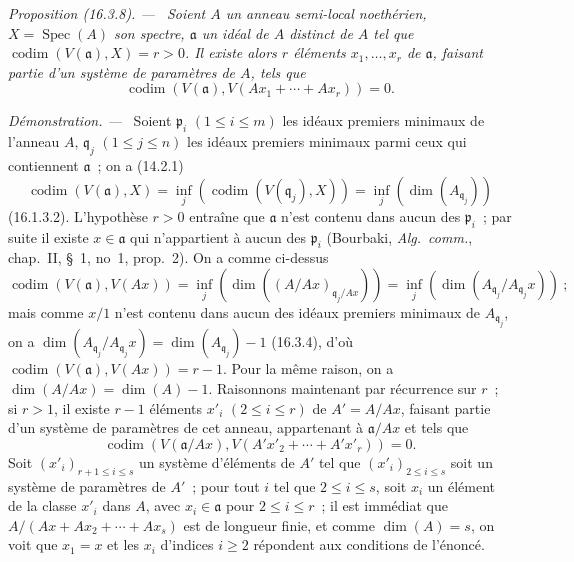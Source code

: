 \documentclass[10pt,oneside]{book}
\makeatletter
\newcommand{\setmanualcurrentlabel}[1]{\def\@currentlabel{#1}}
\newcommand{\oldpage}[2][]{%
  \setcounter{footnote}{0}%
  \marginpar{\scriptsize\textbf{#1}~|~#2}\ignorespaces}
\newenvironment{proposition}[1][]{%
  \setmanualcurrentlabel{#1}\par\medskip\noindent\itshape Proposition (#1). ---\ }{\par}
\newenvironment{proof}{%
  \par\medskip\noindent\textit{Démonstration. ---\ }}{\par}
\makeatother
\begin{document}
\oldpage[0\textsubscript{IV-1}]{31}

\begin{proposition}[16.3.8]
\label{0.16.3.8-fr}
Soient $A$ un anneau semi-local noethérien, $X=\operatorname{Spec}(A)$ son
spectre, $\mathfrak{a}$ un idéal de $A$ distinct de $A$ tel que
$\operatorname{codim}(V(\mathfrak{a}),X)=r>0$. Il existe alors $r$ éléments
$x_1,\ldots,x_r$ de $\mathfrak{a}$, faisant partie d'un système de paramètres
de $A$, tels que
\[
  \operatorname{codim}(V(\mathfrak{a}),
  V(Ax_1+\cdots+Ax_r))=0.
\]
\end{proposition}

\begin{proof}
Soient $\mathfrak{p}_i$ $(1\leq i\leq m)$ les idéaux premiers minimaux de
l'anneau $A$, $\mathfrak{q}_j$ $(1\leq j\leq n)$ les idéaux premiers minimaux
parmi ceux qui contiennent $\mathfrak{a}$~; on a (14.2.1)
\[
  \operatorname{codim}(V(\mathfrak{a}),X)
  =\inf_j(\operatorname{codim}(V(\mathfrak{q}_j),X))
  =\inf_j(\dim(A_{\mathfrak{q}_j}))
\]
(16.1.3.2). L'hypothèse $r>0$ entraîne que $\mathfrak{a}$ n'est contenu dans
aucun des $\mathfrak{p}_i$~; par suite il existe $x\in\mathfrak{a}$ qui
n'appartient à aucun des $\mathfrak{p}_i$ (Bourbaki, \emph{Alg.~comm.},
chap.~II, \S~1, no~1, prop.~2). On a comme ci-dessus
\[
  \operatorname{codim}(V(\mathfrak{a}),V(Ax))
  =\inf_j(\dim((A/Ax)_{\mathfrak{q}_j/Ax}))
  =\inf_j(\dim(A_{\mathfrak{q}_j}/A_{\mathfrak{q}_j}x))~;
\]
mais comme $x/1$ n'est contenu dans aucun des idéaux premiers minimaux de
$A_{\mathfrak{q}_j}$, on a
$\dim(A_{\mathfrak{q}_j}/A_{\mathfrak{q}_j}x)
=\dim(A_{\mathfrak{q}_j})-1$ (16.3.4), d'où
$\operatorname{codim}(V(\mathfrak{a}),V(Ax))=r-1$. Pour la même raison, on a
$\dim(A/Ax)=\dim(A)-1$. Raisonnons maintenant par récurrence sur $r$~; si
$r>1$, il existe $r-1$ éléments $x'_i$ $(2\leq i\leq r)$ de $A'=A/Ax$,
faisant partie d'un système de paramètres de cet anneau, appartenant à
$\mathfrak{a}/Ax$ et tels que
\[
  \operatorname{codim}(V(\mathfrak{a}/Ax),
  V(A'x'_2+\cdots+A'x'_r))=0.
\]
Soit $(x'_i)_{r+1\leq i\leq s}$ un système d'éléments de $A'$ tel que
$(x'_i)_{2\leq i\leq s}$ soit un système de paramètres de $A'$~; pour tout
$i$ tel que $2\leq i\leq s$, soit $x_i$ un élément de la classe $x'_i$ dans
$A$, avec $x_i\in\mathfrak{a}$ pour $2\leq i\leq r$~; il est immédiat que
$A/(Ax+Ax_2+\cdots+Ax_s)$ est de longueur finie, et comme $\dim(A)=s$, on voit
que $x_1=x$ et les $x_i$ d'indices $i\geq2$ répondent aux conditions de
l'énoncé.
\end{proof}
\end{document}
